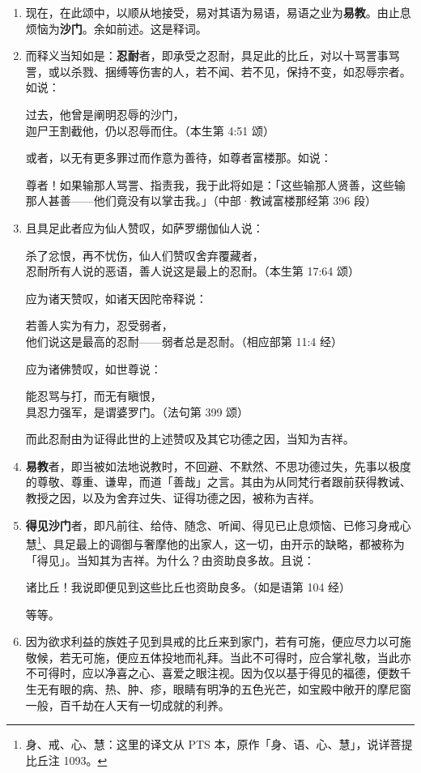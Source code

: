 \begin{enumerate}\item 现在，在此颂中，以顺从地接受，易对其语为易语，易语之业为\textbf{易教}。由止息烦恼为\textbf{沙门}。余如前述。这是释词。
\item 而释义当知如是：\textbf{忍耐}者，即承受之忍耐，具足此的比丘，对以十骂詈事骂詈，或以杀戮、捆缚等伤害的人，若不闻、若不见，保持不变，如忍辱宗者。如说：\begin{quoting}过去，他曾是阐明忍辱的沙门，\\迦尸王割截他，仍以忍辱而住。（本生第 4:51 颂）\end{quoting}或者，以无有更多罪过而作意为善待，如尊者富楼那。如说：\begin{quoting}尊者！如果输那人骂詈、指责我，我于此将如是：「这些输那人贤善，这些输那人甚善——他们竟没有以掌击我。」（中部·教诫富楼那经第 396 段）\end{quoting}
\item 且具足此者应为仙人赞叹，如萨罗绷伽仙人说：\begin{quoting}杀了忿恨，再不忧伤，仙人们赞叹舍弃覆藏者，\\忍耐所有人说的恶语，善人说这是最上的忍耐。（本生第 17:64 颂）\end{quoting}应为诸天赞叹，如诸天因陀帝释说：\begin{quoting}若善人实为有力，忍受弱者，\\他们说这是最高的忍耐——弱者总是忍耐。（相应部第 11:4 经）\end{quoting} 应为诸佛赞叹，如世尊说：\begin{quoting}能忍骂与打，而无有瞋恨，\\具忍力强军，是谓婆罗门。（法句第 399 颂）\end{quoting}而此忍耐由为证得此世的上述赞叹及其它功德之因，当知为吉祥。
\item \textbf{易教}者，即当被如法地说教时，不回避、不默然、不思功德过失，先事以极度的尊敬、尊重、谦卑，而道「善哉」之言。其由为从同梵行者跟前获得教诫、教授之因，以及为舍弃过失、证得功德之因，被称为吉祥。
\item \textbf{得见沙门}者，即凡前往、给侍、随念、听闻、得见已止息烦恼、已修习身戒心慧\footnote{身、戒、心、慧：这里的译文从 PTS 本，原作「身、语、心、慧」，说详菩提比丘注 1093。}、具足最上的调御与奢摩他的出家人，这一切，由开示的缺略，都被称为「得见」。当知其为吉祥。为什么？由资助良多故。且说：\begin{quoting}诸比丘！我说即便见到这些比丘也资助良多。（如是语第 104 经）\end{quoting}等等。
\item 因为欲求利益的族姓子见到具戒的比丘来到家门，若有可施，便应尽力以可施敬候，若无可施，便应五体投地而礼拜。当此不可得时，应合掌礼敬，当此亦不可得时，应以净喜之心、喜爱之眼注视。因为仅以基于得见的福德，便数千生无有眼的病、热、肿、疹，眼睛有明净的五色光芒，如宝殿中敞开的摩尼窗一般，百千劫在人天有一切成就的利养。

\end{enumerate}
